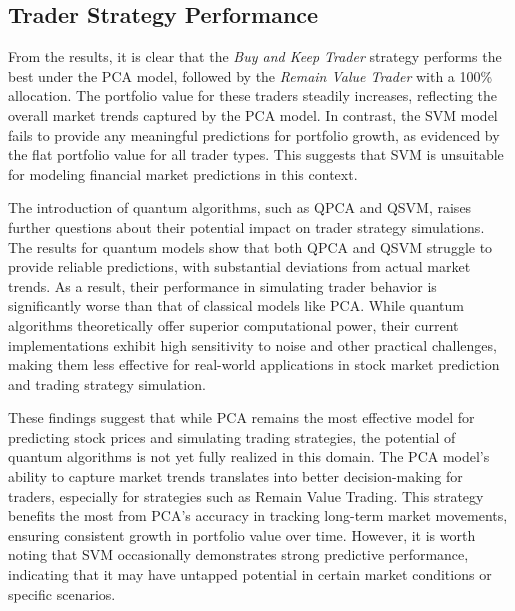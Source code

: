 \documentclass[journal]{IEEEtran}
\begin{document}
\subsection{Trader Strategy Performance}

From the results, it is clear that the \textit{Buy and Keep Trader} strategy performs the best under the PCA model, followed by the \textit{Remain Value Trader} with a 100\% allocation. The portfolio value for these traders steadily increases, reflecting the overall market trends captured by the PCA model. In contrast, the SVM model fails to provide any meaningful predictions for portfolio growth, as evidenced by the flat portfolio value for all trader types. This suggests that SVM is unsuitable for modeling financial market predictions in this context.

The introduction of quantum algorithms, such as QPCA and QSVM, raises further questions about their potential impact on trader strategy simulations. The results for quantum models show that both QPCA and QSVM struggle to provide reliable predictions, with substantial deviations from actual market trends. As a result, their performance in simulating trader behavior is significantly worse than that of classical models like PCA. While quantum algorithms theoretically offer superior computational power, their current implementations exhibit high sensitivity to noise and other practical challenges, making them less effective for real-world applications in stock market prediction and trading strategy simulation.

These findings suggest that while PCA remains the most effective model for predicting stock prices and simulating trading strategies, the potential of quantum algorithms is not yet fully realized in this domain. The PCA model’s ability to capture market trends translates into better decision-making for traders, especially for strategies such as Remain Value Trading. This strategy benefits the most from PCA’s accuracy in tracking long-term market movements, ensuring consistent growth in portfolio value over time. However, it is worth noting that SVM occasionally demonstrates strong predictive performance, indicating that it may have untapped potential in certain market conditions or specific scenarios.
\end{document}
